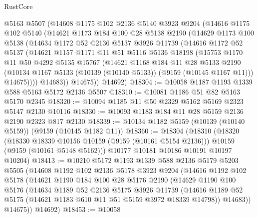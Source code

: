 \begin{lexlean}{RustCore}
\begin{coremodule}
    @5163
    @5507
    (@14608
      @1175
      @102
      @2136
      @5140
      @3923
      @9204
      (@14616
        @1175
        @102
        @5140
        (@14621
          @1173
          @184
          @100
          @28
          @5138
          @2190
          (@14629
            @1173
            @100
            @5138
            (@14634
              @1172
              @52
              @2136
              @5137
              @3926
              @11739
              (@14616
                @1172
                @52
                @5137
                (@14621
                  @1157
                  @1171
                  @11
                  @51
                  @5116
                  @5136
                  @18198
                  (@15753
                    @1170
                    @11
                    @50
                    @4292
                    @5135
                    @15767
                    (@14621
                      @1168
                      @184
                      @11
                      @28
                      @5133
                      @2190
                      (@10134 @1167 @5133 (@10139 (@10140 @5133)) (@9159 (@10145 @1167 @11)))
                      @14675))))
              @14683))
          @14675))
      @14692)
@18304 := @10058 @1187 @1193 @1339 @588 @5163 @5172 @2136 @5507
@18310 := @10081 @1186 @51 @82 @5163 @5170 @2345
@18320 := @10094 @1185 @11 @50 @2329 @5162 @5169 @2323 @5147 @2130 @10116
@18330 := @10093 @1183 @184 @11 @28 @5159 @2136 @2190 @2323 @817 @2130
@18339 := @10134 @1182 @5159 (@10139 (@10140 @5159)) (@9159 (@10145 @1182 @11))
@18360 := @18304
    (@18310
      (@18320
        (@18330 @18339 @10156 @10159 (@9159 (@10161 @5154 @2136)))
        @10159
        (@9159 (@10161 @5148 @5162)))
      @10177
      @10181
      @10186
      @10191
      @10197
      @10204)
@18413 := @10210
    @5172
    @1193
    @1339
    @588
    @2136
    @5179
    @5203
    @5505
    (@14608
      @1192
      @102
      @2136
      @5178
      @3923
      @9204
      (@14616
        @1192
        @102
        @5178
        (@14621
          @1190
          @184
          @100
          @28
          @5176
          @2190
          (@14629
            @1190
            @100
            @5176
            (@14634
              @1189
              @52
              @2136
              @5175
              @3926
              @11739
              (@14616 @1189 @52 @5175 (@14621 @1183 @610 @11 @51 @5159 @3972 @18339 @14798))
              @14683))
          @14675))
      @14692)
@18453 := @10058

\end{coremodule}
\end{lexlean}
